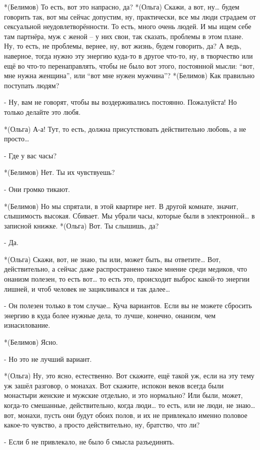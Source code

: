 *(Белимов) То есть, вот это напрасно, да?
*(Ольга) Скажи, а вот, ну… будем говорить так, вот мы сейчас допустим, ну, практически, все мы люди страдаем от сексуальной неудовлетворённости. То есть, много очень людей. И мы ищем себе там партнёра, муж с женой – у них свои, так сказать, проблемы в этом плане. Ну, то есть, не проблемы, вернее, ну, вот жизнь, будем говорить, да? А ведь, наверное, тогда нужно эту энергию куда-то в другое что-то, ну, в творчество или ещё во что-то перенаправлять, чтобы не было вот этого, постоянной мысли: “вот, мне нужна женщина”, или “вот мне нужен мужчина”?
*(Белимов) Как правильно поступать людям?

- Ну, вам не говорят, чтобы вы воздерживались постоянно. Пожалуйста! Но только делайте это любя.

*(Ольга) А-а! Тут, то есть, должна присутствовать действительно любовь, а не просто…

- Где у вас часы?

*(Белимов) Нет. Ты их чувствуешь?

- Они громко тикают.

*(Белимов) Но мы спрятали, в этой квартире нет. В другой комнате, значит, слышимость высокая. Сбивает. Мы убрали часы,  которые были в электронной… в записной книжке.
*(Ольга) Вот. Ты слышишь, да?

- Да.

*(Ольга) Скажи, вот, не знаю, ты или, может быть, вы ответите… Вот, действительно, а сейчас даже распространено такое мнение среди медиков, что онанизм полезен, то есть вот… то есть это, происходит выброс какой-то энергии лишней, и чтоб человек не зацикливался и так далее…

- Он полезен только в том случае… Куча вариантов. Если вы не можете сбросить энергию в куда более нужные дела, то лучше, конечно, онанизм, чем изнасилование.

*(Белимов) Ясно.

- Но это не лучший вариант.

*(Ольга) Ну, это ясно, естественно. Вот скажите, ещё такой уж, если на эту тему уж зашёл разговор, о монахах. Вот скажите, испокон веков всегда были монастыри женские и мужские отдельно, и это нормально? Или были, может, когда-то смешанные, действительно, когда люди… то есть, или не люди, не знаю… вот, монахи, пусть они будут обоих полов, и их не привлекало именно половое какое-то чувство, а просто действительно, ну, братство, что ли?

- Если б не привлекало, не было б смысла разъединять.

